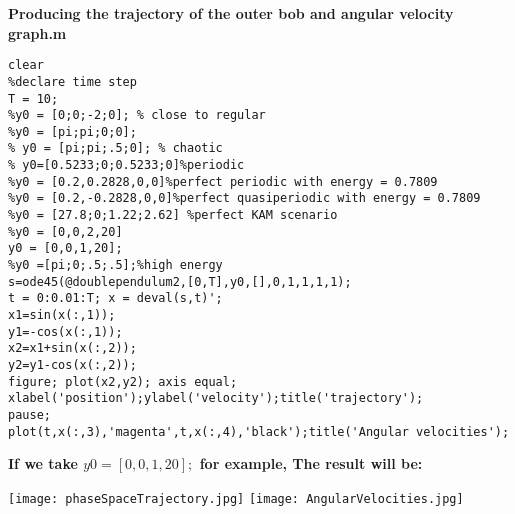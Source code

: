 \documentclass[11]{article}
\begin{document}
\noindent \textbf{Producing the trajectory of the outer bob and angular velocity graph.m}

\begin{verbatim}
clear
%declare time step
T = 10;
%y0 = [0;0;-2;0]; % close to regular
%y0 = [pi;pi;0;0];
% y0 = [pi;pi;.5;0]; % chaotic
% y0=[0.5233;0;0.5233;0]%periodic
%y0 = [0.2,0.2828,0,0]%perfect periodic with energy = 0.7809
%y0 = [0.2,-0.2828,0,0]%perfect quasiperiodic with energy = 0.7809
%y0 = [27.8;0;1.22;2.62] %perfect KAM scenario
%y0 = [0,0,2,20]
y0 = [0,0,1,20];
%y0 =[pi;0;.5;.5];%high energy
s=ode45(@doublependulum2,[0,T],y0,[],0,1,1,1,1);
t = 0:0.01:T; x = deval(s,t)';
x1=sin(x(:,1));
y1=-cos(x(:,1));
x2=x1+sin(x(:,2));
y2=y1-cos(x(:,2));
figure; plot(x2,y2); axis equal; xlabel('position');ylabel('velocity');title('trajectory');
pause;
plot(t,x(:,3),'magenta',t,x(:,4),'black');title('Angular velocities');
\end{verbatim}

\newpage

\noindent \textbf{If we take $y0 = [0,0,1,20];$ for example, The result will be:}

\begin{center}
\texttt{[image: phaseSpaceTrajectory.jpg]}
\texttt{[image: AngularVelocities.jpg]}
\end{center}
\end{document}
